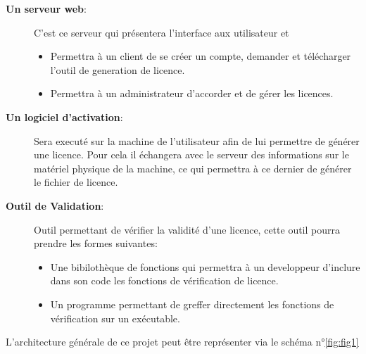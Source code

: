 \begin{description}
	\item[\textbf{Un serveur web}:]
				C'est ce serveur qui présentera l'interface aux utilisateur et  
				\begin{itemize}
					\item Permettra à un client de se créer un compte, demander et 
								télécharger l'outil de generation de licence.
					\item Permettra à un administrateur d'accorder et de gérer les licences. 
				\end{itemize}
	\item[\textbf{Un logiciel d'activation}:] 
				Sera executé sur la machine de l'utilisateur
				afin de lui permettre de générer une licence. Pour cela il échangera avec
				le serveur des informations sur le matériel physique de la machine, ce 
				qui permettra à ce dernier de générer le fichier de licence.
	\item[\textbf{Outil de Validation}:]
				Outil permettant de vérifier la validité d'une licence, cette outil
				pourra prendre les formes suivantes: 
				\begin{itemize}
				\item Une bibilothèque de fonctions qui permettra à un developpeur d'inclure
							dans son code les fonctions de vérification de licence. 
				\item Un programme permettant de greffer directement les fonctions de vérification
							sur un exécutable. 
				\end{itemize}
\end{description}

L'architecture générale de ce projet peut être représenter via 
le schéma n°\ref{fig:fig1}\newline

